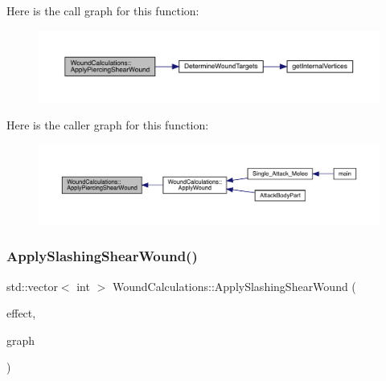 Here is the call graph for this function\+:
\nopagebreak
\begin{figure}[H]
\begin{center}
\leavevmode
\includegraphics[width=350pt]{db/d1e/class_wound_calculations_ac763bba5d770b968ab68532b974d878d_cgraph}
\end{center}
\end{figure}
Here is the caller graph for this function\+:
\nopagebreak
\begin{figure}[H]
\begin{center}
\leavevmode
\includegraphics[width=350pt]{db/d1e/class_wound_calculations_ac763bba5d770b968ab68532b974d878d_icgraph}
\end{center}
\end{figure}
\mbox{\label{class_wound_calculations_ae0e649e97591c6a6b28d6a4ff7e0324e}} 
\subsubsection{\texorpdfstring{Apply\+Slashing\+Shear\+Wound()}{ApplySlashingShearWound()}}
{\footnotesize\ttfamily std\+::vector$<$ int $>$ Wound\+Calculations\+::\+Apply\+Slashing\+Shear\+Wound (\begin{DoxyParamCaption}\item[{\mbox{\hyperlink{struct_applied_force_effect}{Applied\+Force\+Effect}} \&}]{effect,  }\item[{\mbox{\hyperlink{_body_graph_8hpp_ab01b157c2e143191570b012d275fbf0d}{Anatomy\+Graph}} \&}]{graph }\end{DoxyParamCaption})}

